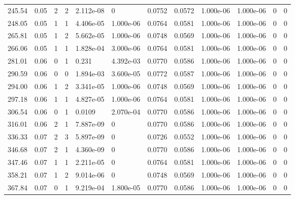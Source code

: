 \documentclass[preview]{standalone}
\begin{document}
{{\begin{tabular}{L{1.2cm}C{1.2cm} C{0.3cm}C{0.5cm} C{1.4cm}C{1.4cm} C{1.4cm}C{1.4cm} C{1.6cm}C{1.6cm} C{1.6cm}C{1.6cm}}
  245.54  &  0.05  & 2     &  2 &  2.112e-08  & 0  &  0.0752&   0.0572& 1.000e-06 & 1.000e-06   &  0 & 0  \\ 
  248.05  &  0.05  & 1     &  1 &  4.406e-05  & 1.000e-06  &  0.0764&   0.0581& 1.000e-06 & 1.000e-06   &  0 & 0  \\ 
  265.81  &  0.05  & 1     &  2 &  5.662e-05  & 1.000e-06  &  0.0748&   0.0569& 1.000e-06 & 1.000e-06   &  0 & 0  \\ 
  266.06  &  0.05  & 1     &  1 &  1.828e-04  & 3.000e-06  &  0.0764&   0.0581& 1.000e-06 & 1.000e-06   &  0 & 0  \\ 
  281.01  &  0.06  & 0     &  1 &  0.231  & 4.392e-03  &  0.0770&   0.0586& 1.000e-06 & 1.000e-06   &  0 & 0  \\ 
  290.59  &  0.06  & 0     &  0 &  1.894e-03  & 3.600e-05  &  0.0772&   0.0587& 1.000e-06 & 1.000e-06   &  0 & 0  \\ 
  294.00  &  0.06  & 1     &  2 &  3.341e-05  & 1.000e-06  &  0.0748&   0.0569& 1.000e-06 & 1.000e-06   &  0 & 0  \\ 
  297.18  &  0.06  & 1     &  1 &  4.827e-05  & 1.000e-06  &  0.0764&   0.0581& 1.000e-06 & 1.000e-06   &  0 & 0  \\ 
  306.54  &  0.06  & 0     &  1 &  0.0109  & 2.070e-04  &  0.0770&   0.0586& 1.000e-06 & 1.000e-06   &  0 & 0  \\ 
  316.01  &  0.06  & 2     &  1 &  7.887e-09  & 0  &  0.0770&   0.0586& 1.000e-06 & 1.000e-06   &  0 & 0  \\ 
  336.33  &  0.07  & 2     &  3 &  5.897e-09  & 0  &  0.0726&   0.0552& 1.000e-06 & 1.000e-06   &  0 & 0  \\ 
  346.68  &  0.07  & 2     &  1 &  4.360e-09  & 0  &  0.0770&   0.0586& 1.000e-06 & 1.000e-06   &  0 & 0  \\ 
  347.46  &  0.07  & 1     &  1 &  2.211e-05  & 0  &  0.0764&   0.0581& 1.000e-06 & 1.000e-06   &  0 & 0  \\ 
  358.21  &  0.07  & 1     &  2 &  9.014e-06  & 0  &  0.0748&   0.0569& 1.000e-06 & 1.000e-06   &  0 & 0  \\ 
  367.84  &  0.07  & 0     &  1 &  9.219e-04  & 1.800e-05  &  0.0770&   0.0586& 1.000e-06 & 1.000e-06   &  0 & 0  \\ 
\hline 
\end{tabular} 

}}
\end{document}
